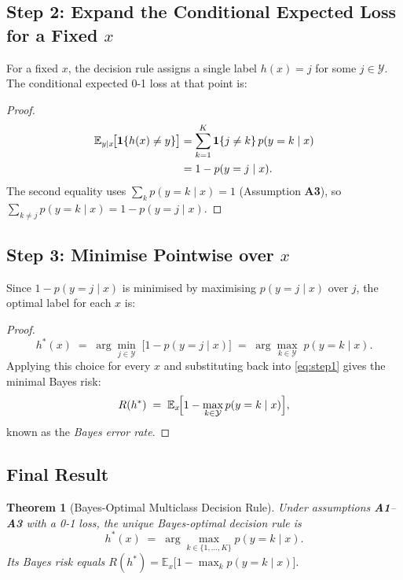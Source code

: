 \documentclass[11pt]{article}
\newtheorem{theorem}{Theorem}[section]
\theoremstyle{definition}
\theoremstyle{remark}
\newcommand{\E}{\mathbb{E}}
\begin{document}
\subsection{Step 2: Expand the Conditional Expected Loss for a Fixed $x$}

For a fixed $x$, the decision rule assigns a single label $h(x) = j$ for some
$j \in \mathcal{Y}$.  The conditional expected 0-1 loss at that point is:

\begin{proof}
    \begin{align}
        \E_{y \mid x}\!\bigl[\mathbf{1}\{h(x) \neq y\}\bigr]
        &= \sum_{k=1}^{K} \mathbf{1}\{j \neq k\}\, p(y = k \mid x) \notag \\
        &= 1 - p(y = j \mid x).
        \label{eq:step2}
    \end{align}
    The second equality uses $\sum_{k} p(y=k\mid x) = 1$ (Assumption \textbf{A3}),
    so $\sum_{k \neq j} p(y=k\mid x) = 1 - p(y=j\mid x)$.
\end{proof}

\subsection{Step 3: Minimise Pointwise over $x$}

Since $1 - p(y = j \mid x)$ is minimised by maximising $p(y = j \mid x)$ over
$j$, the optimal label for each $x$ is:

\begin{proof}
    \[
        h^{*}(x)
        \;=\; \arg\min_{j \in \mathcal{Y}}\;\bigl[1 - p(y = j \mid x)\bigr]
        \;=\; \arg\max_{k \in \mathcal{Y}}\; p(y = k \mid x).
    \]
    Applying this choice for every $x$ and substituting back into
    \eqref{eq:step1} gives the minimal Bayes risk:
    \[
        R(h^{*})
        \;=\; \E_{x}\!\Bigl[1 - \max_{k \in \mathcal{Y}} p(y = k \mid x)\Bigr],
    \]
    known as the \emph{Bayes error rate}.
\end{proof}

\subsection{Final Result}

\begin{theorem}[Bayes-Optimal Multiclass Decision Rule]
    Under assumptions \textbf{A1}--\textbf{A3} with a 0-1 loss, the unique
    Bayes-optimal decision rule is
    \[
        \boxed{h^{*}(x) \;=\; \arg\max_{k \in \{1,\ldots,K\}} p(y = k \mid x).}
    \]
    Its Bayes risk equals
    \(
        R(h^{*}) = \E_{x}\!\bigl[1 - \max_{k} p(y=k\mid x)\bigr].
    \)
\end{theorem}
\end{document}
